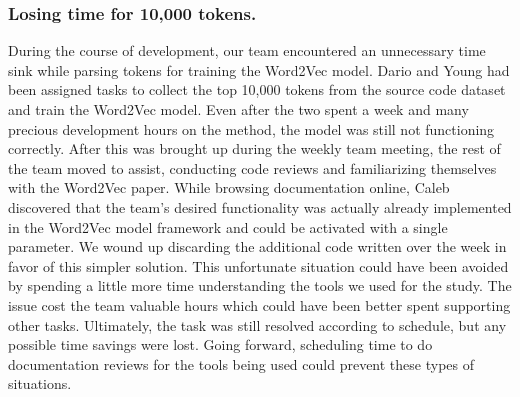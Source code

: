 \subsubsection{\textbf{Losing time for 10,000 tokens.}} During the course of development, our team encountered an unnecessary time sink while parsing tokens for training the Word2Vec model. Dario and Young had been assigned tasks to collect the top 10,000 tokens from the source code dataset and train the Word2Vec model. Even after the two spent a week and many precious development hours on the method, the model was still not functioning correctly. After this was brought up during the weekly team meeting, the rest of the team moved to assist, conducting code reviews and familiarizing themselves with the Word2Vec paper. While browsing documentation online, Caleb discovered that the team's desired functionality was actually already implemented in the Word2Vec model framework and could be activated with a single parameter. We wound up discarding the additional code written over the week in favor of this simpler solution. This unfortunate situation could have been avoided by spending a little more time understanding the tools we used for the study. The issue cost the team valuable hours which could have been better spent supporting other tasks. Ultimately, the task was still resolved according to schedule, but any possible time savings were lost. Going forward, scheduling time to do documentation reviews for the tools being used could prevent these types of situations. 
